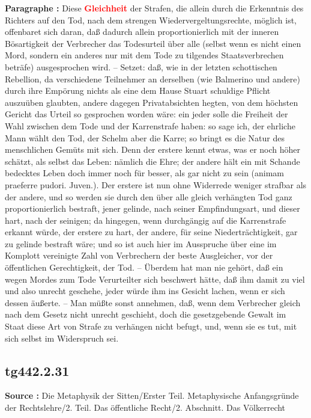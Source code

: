 \documentclass[a4paper,12pt,twoside]{book}
\newcommand{\match}[1]{\textcolor{red}{\textbf{#1}}}
\begin{document}
	\textbf{Paragraphe : }Diese \match{Gleichheit} der Strafen, die allein durch die Erkenntnis des Richters auf den Tod, nach dem strengen Wiedervergeltungsrechte, möglich ist, offenbaret sich daran, daß dadurch allein proportionierlich mit der inneren Bösartigkeit der Verbrecher das Todesurteil über alle (selbst wenn es nicht einen Mord, sondern ein anderes nur mit dem Tode zu tilgendes Staatsverbrechen beträfe) ausgesprochen wird. – Setzet: daß, wie in der letzten schottischen Rebellion, da verschiedene Teilnehmer an derselben (wie Balmerino und andere) durch ihre Empörung nichts als eine dem Hause Stuart schuldige Pflicht auszuüben glaubten, andere dagegen Privatabsichten hegten, von dem höchsten Gericht das Urteil so gesprochen worden wäre: ein jeder solle die Freiheit der Wahl zwischen dem Tode und der Karrenstrafe haben: so sage ich, der ehrliche Mann wählt den Tod, der Schelm aber die Karre; so bringt es die Natur des menschlichen Gemüts mit sich. Denn der erstere kennt etwas, was er noch höher schätzt, als selbst das Leben: nämlich die
	Ehre; der andere hält ein mit Schande bedecktes Leben doch immer noch für besser, als gar nicht zu sein (animam praeferre pudori. Juven.). Der erstere ist nun ohne Widerrede weniger strafbar als der andere, und so werden sie durch den über alle gleich verhängten Tod ganz proportionierlich bestraft, jener gelinde, nach seiner Empfindungsart, und dieser hart, nach der seinigen; da hingegen, wenn durchgängig auf die Karrenstrafe erkannt würde, der erstere zu hart, der andere, für seine Niederträchtigkeit, gar zu gelinde bestraft wäre; und so ist auch hier im Ausspruche über eine im Komplott vereinigte Zahl von Verbrechern der beste Ausgleicher, vor der öffentlichen Gerechtigkeit, der Tod. – Überdem hat man nie gehört, daß ein wegen Mordes zum Tode Verurteilter sich beschwert hätte, daß ihm damit zu viel und also unrecht geschehe, jeder würde ihm ins Gesicht lachen, wenn er sich dessen äußerte. – Man müßte sonst annehmen, daß, wenn dem Verbrecher gleich nach dem Gesetz nicht unrecht geschieht, doch die gesetzgebende Gewalt im Staat diese Art von Strafe zu verhängen nicht befugt, und, wenn sie es tut, mit sich selbst im Widerspruch sei. 
	
	\subsection*{tg442.2.31} 
	\textbf{Source : }Die Metaphysik der Sitten/Erster Teil. Metaphysische Anfangsgründe der Rechtslehre/2. Teil. Das öffentliche Recht/2. Abschnitt. Das Völkerrecht\\  
	
\end{document}
